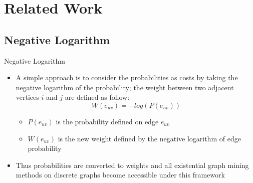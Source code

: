 \documentclass[9pt]{beamer}
\newcommand{\themename}{\textbf{\textsc{metropolis}}\xspace}
\begin{document}
\section{Related Work}
\subsection{Negative Logarithm \cite{potamias2009nearest}}
\begin{frame}{Negative Logarithm \cite{potamias2009nearest}}
\begin{itemize}
\item A simple approach is to consider the probabilities
as costs by taking the negative logarithm of the probability; the weight between two adjacent vertices $i$ and $j$ are defined as follow:
\begin{equation*}
W(e_{uv}) = -log(P(e_{uv}))
\end{equation*}
\vspace{-0.2in}
\begin{itemize}
\item $P(e_{uv})$ is the probability defined on edge $e_{uv}$
\item $W(e_{uv})$ is the new weight defined by the negative logarithm of edge probability
\end{itemize}
\item Thus probabilities are converted to weights and all existential graph mining methods on discrete graphs become accessible under this framework
\end{itemize}
\end{frame}


\end{document}
